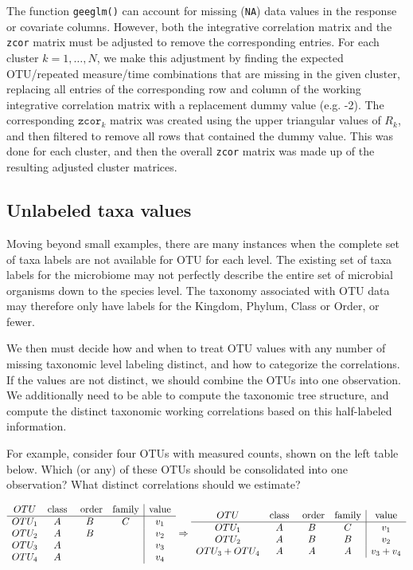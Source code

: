 \documentclass[12pt]{article}
\begin{document}
The function \texttt{geeglm()} can account for missing (\texttt{NA}) data values in the response or covariate columns. However, both the integrative correlation matrix and the \texttt{zcor} matrix must be adjusted to remove the corresponding entries. For each cluster $k = 1, \ldots , N$, we make this adjustment by finding the expected OTU/repeated measure/time combinations that are missing in the given cluster, replacing all entries of the corresponding row and column of the working integrative correlation matrix with a replacement dummy value (e.g. -2). The corresponding $\texttt{zcor}_k$ matrix was created using the upper triangular values of $R_k$, and then filtered to remove all rows that contained the dummy value. This was done for each cluster, and then the overall \texttt{zcor} matrix was made up of the resulting adjusted cluster matrices.


\subsection{Unlabeled taxa values}

Moving beyond small examples, there are many instances when the complete set of taxa labels are not available for OTU for each level. The existing set of taxa labels for the microbiome may not perfectly describe the entire set of microbial organisms down to the species level. The taxonomy associated with OTU data may therefore only have labels for the Kingdom, Phylum, Class or Order, or fewer.

We then must decide how and when to treat OTU values with any number of missing taxonomic level labeling distinct, and how to categorize the correlations. If the values are not distinct, we should combine the OTUs into one observation. We additionally need to be able to compute the taxonomic tree structure, and compute the distinct taxonomic working correlations based on this half-labeled information.

For example, consider four OTUs with measured counts, shown on the left table below. Which (or any) of these OTUs should be consolidated into one observation? What distinct correlations should we estimate?

\begin{singlespace}
$$\begin{array}{c c c c | c }
  OTU & \text{class} & \text{ order} & \text{family} & \text{value}\\
  \hline
  OTU_1 & A & B & C & v_1\\
  OTU_2 & A & B & & v_2\\
  OTU_3 & A & & & v_3 \\
  OTU_4 & A & & & v_4
\end{array}
\Rightarrow
\begin{array}{c c c c | c }
  OTU & \text{class} & \text{ order} & \text{family} & \text{value}\\
  \hline
  OTU_1 & A & B & C & v_1\\
  OTU_2 & A & B & B & v_2\\
  OTU_3 + OTU_4 & A & A & A & v_3 + v_4
\end{array}
 $$
\end{singlespace}
\end{document}
